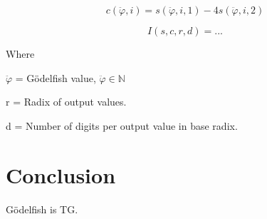 \documentclass{article}
\begin{document}
\begin{equation}
	c(\ddot{\varphi}, i) = s(\ddot{\varphi}, i, 1) - 4s(\ddot{\varphi}, i, 2)
\end{equation}

\begin{equation}
	I(s, c, r, d) = ...
\end{equation}

Where

$\ddot{\varphi}$ = Gödelfish value, $\ddot{\varphi} \in \mathbb{N}$

r = Radix of output values.

d = Number of digits per output value in base radix.


\section{Conclusion}
Gödelfish is TG.
\end{document}
